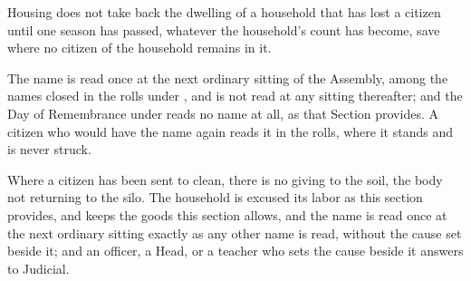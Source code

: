\begin{clauses}
\item Housing does not take back the dwelling of a household that has lost a citizen until one season has passed, whatever the household's count has become, save where no citizen of the household remains in it.
\item The name is read once at the next ordinary sitting of the Assembly, among the names closed in the rolls under , and is not read at any sitting thereafter; and the Day of Remembrance under  reads no name at all, as that Section provides. A citizen who would have the name again reads it in the rolls, where it stands and is never struck.
\item Where a citizen has been sent to clean, there is no giving to the soil, the body not returning to the silo. The household is excused its labor as this section provides, and keeps the goods this section allows, and the name is read once at the next ordinary sitting exactly as any other name is read, without the cause set beside it; and an officer, a Head, or a teacher who sets the cause beside it answers to Judicial.
\end{clauses}
